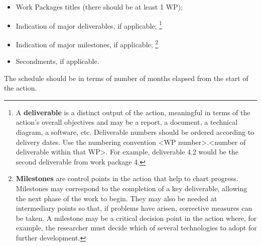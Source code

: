 \begin{itemize}
  \item Work Packages titles (there should be at least 1 WP);
  \item Indication of major deliverables, if applicable;
  \footnote{A \textbf{deliverable} is a distinct output of the action, meaningful in terms of the action’s overall objectives and may be a report, a document, a
  technical diagram, a software, etc. Deliverable numbers should be ordered according to delivery dates. Use the numbering convention <WP
  number>.<number of deliverable within that WP>. For example, deliverable 4.2 would be the second deliverable from work package 4.}
  \item Indication of major milestones, if applicable;
  \footnote{\textbf{Milestones} are control points in the action that help to chart progress. Milestones may correspond to the completion of a key deliverable,
  allowing the next phase of the work to begin. They may also be needed at intermediary points so that, if problems have arisen, corrective
  measures can be taken. A milestone may be a critical decision point in the action where, for example, the researcher must decide which of several
  technologies to adopt for further development.}
  \item Secondments, if applicable.
\end{itemize}

\medskip\noindent
The schedule should be in terms of number of months elapsed from the start of the
action.


